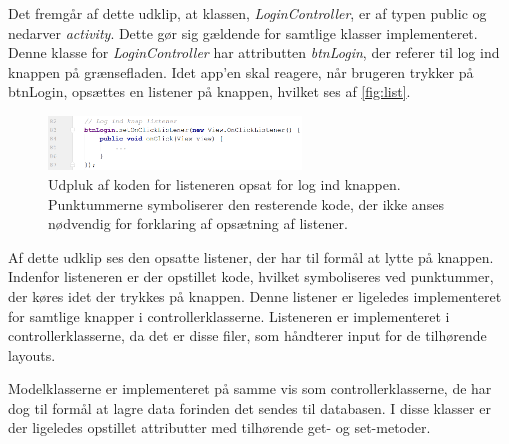 \noindent
Det fremgår af dette udklip, at klassen, \textit{LoginController}, er af typen public og nedarver \textit{activity}. Dette gør sig gældende for samtlige klasser implementeret. Denne klasse for \textit{LoginController} har attributten \textit{btnLogin}, der referer til log ind knappen på grænsefladen. Idet app'en skal reagere, når brugeren trykker på btnLogin, opsættes en listener på knappen, hvilket ses af \autoref{fig:list}.


\begin{figure} [H]
\centering
\includegraphics[width=0.6\textwidth]{figures/imple/list}
\caption{Udpluk af koden for listeneren opsat for log ind knappen. Punktummerne symboliserer den resterende kode, der ikke anses nødvendig for forklaring af opsætning af listener.}
\label{fig:list}
\end{figure}


\noindent
Af dette udklip ses den opsatte listener, der har til formål at lytte på knappen. Indenfor listeneren er der opstillet kode, hvilket symboliseres ved punktummer, der køres idet der trykkes på knappen. Denne listener er ligeledes implementeret for samtlige knapper i controllerklasserne. Listeneren er implementeret i controllerklasserne, da det er disse filer, som håndterer input for de tilhørende layouts.

Modelklasserne er implementeret på samme vis som controllerklasserne, de har dog til formål at lagre data forinden det sendes til databasen. I disse klasser er der ligeledes opstillet attributter med tilhørende get- og set-metoder. 

